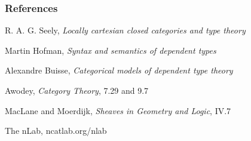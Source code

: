 \documentclass[
xcolor={usenames,dvipsnames,svgnames},
]{beamer}
\begin{document}
  \begin{frame}
    \frametitle{References}
    R. A. G. Seely, \textit{Locally cartesian closed categories and type theory}

    Martin Hofman, \textit{Syntax and semantics of dependent types}

    Alexandre Buisse, \textit{Categorical models of dependent type theory}

    Awodey, \textit{Category Theory}, 7.29 and 9.7

    MacLane and Moerdijk, \textit{Sheaves in Geometry and Logic}, IV.7

    The nLab, ncatlab.org/nlab

  \end{frame}

  \begin{frame}
    \frametitle{}
    \begin{center}

    \end{center}
  \end{frame}
\end{document}
